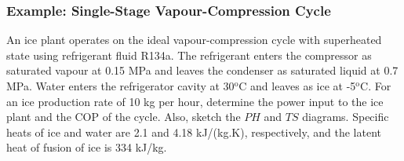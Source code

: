 \documentclass[10pt,compress]{beamer}
\begin{document}
\begin{frame}
 \frametitle{Example: Single-Stage Vapour-Compression Cycle}
 An ice plant operates on the ideal vapour-compression cycle with superheated state using refrigerant fluid R134a.  The refrigerant enters the compressor as saturated vapour at 0.15 MPa and leaves the condenser as saturated liquid at 0.7 MPa.  Water enters the refrigerator cavity at 30$^{\text{o}}$C and leaves as ice at -5$^{\text{o}}$C. For an ice production rate of 10 kg per hour, determine the power input to the ice plant and the COP of the cycle. Also, sketch the $PH$ and $TS$ diagrams. Specific heats of ice and water are 2.1 and 4.18 kJ/(kg.K), respectively, and the latent heat of fusion of ice is 334 kJ/kg.

\end{frame}

\end{document}
